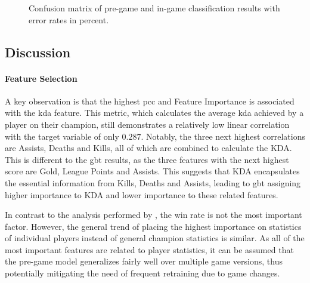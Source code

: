 \documentclass[12pt, a4paper, headinclude, twoside, plainheadsepline, open=right, numbers=noenddot, hidelinks, toc=listof, toc=bibliography]{scrreprt}
\begin{document}
\begin{figure}[htbp]
\centering

\caption{Confusion matrix of pre-game and in-game classification results with error rates in percent.}
\label{fig:cm_static}
\end{figure}

\subsection{Discussion}
\label{ssec:discussion}
\paragraph{Feature Selection}
A key observation is that the highest \ac{pcc} and Feature Importance is associated with the \acs{kda} feature. 
This metric, which calculates the average \acl{kda} achieved by a player on their champion, still demonstrates a relatively low linear correlation with the target variable of only $0.287$.
Notably, the three next highest correlations are Assists, Deaths and Kills, all of which are combined to calculate the KDA.
This is different to the \ac{gbt} results, as the three features with the next highest score are Gold, League Points and Assists.
This suggests that KDA encapsulates the essential information from Kills, Deaths and Assists, leading to \ac{gbt} assigning higher importance to KDA and lower importance to these related features.

In contrast to the analysis performed by \citeauthor{costaFeatureAnalysisLeague2021} \cite{costaFeatureAnalysisLeague2021}, the win rate is not the most important factor.
However, the general trend of placing the highest importance on statistics of individual players instead of general champion statistics is similar.
As all of the most important features are related to player statistics, it can be assumed that the pre-game model generalizes fairly well over multiple game versions, thus potentially mitigating the need of frequent retraining due to game changes.
\end{document}
